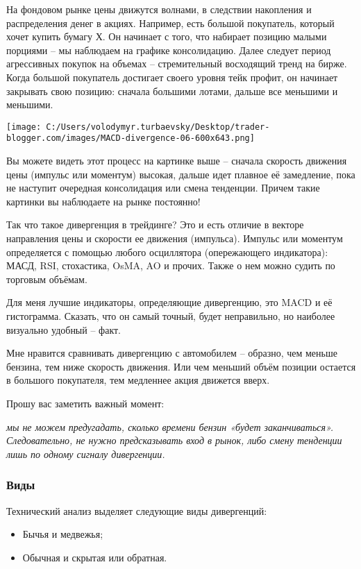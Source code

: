 \documentclass[a5paper]{article}
\begin{document}
На фондовом рынке цены движутся волнами, в следствии накопления и распределения денег в акциях. Например, есть большой покупатель, который хочет купить бумагу Х. Он начинает с того, что набирает позицию малыми порциями – мы наблюдаем на графике консолидацию. Далее следует период агрессивных покупок на объемах – стремительный восходящий тренд на бирже. Когда большой покупатель достигает своего уровня тейк профит, он начинает закрывать свою позицию: сначала большими лотами, дальше все меньшими и меньшими.

\texttt{[image: C:/Users/volodymyr.turbaevsky/Desktop/trader-blogger.com/images/MACD-divergence-06-600x643.png]}

Вы можете видеть этот процесс на картинке выше – сначала скорость движения цены (импульс или моментум) высокая, дальше идет плавное её замедление, пока не наступит очередная консолидация или смена тенденции. Причем такие картинки вы наблюдаете на рынке постоянно!

Так что такое дивергенция в трейдинге? Это и есть отличие в векторе направления цены и скорости ее движения (импульса). Импульс или моментум определяется с помощью любого осциллятора (опережающего индикатора): МАСД, RSI, стохастика, OsMA, AO и прочих. Также о нем можно судить по торговым объёмам.

Для меня лучшие индикаторы, определяющие дивергенцию, это MACD и её гистограмма. Сказать, что он самый точный, будет неправильно, но наиболее визуально удобный – факт.

Мне нравится сравнивать дивергенцию с автомобилем – образно, чем меньше бензина, тем ниже скорость движения. Или чем меньший объём позиции остается в большого покупателя, тем медленнее акция движется вверх.

Прошу вас заметить важный момент:

        \emph{мы не можем предугадать, сколько времени бензин «будет заканчиваться». Следовательно, не нужно предсказывать вход в рынок, либо смену тенденции лишь по одному сигналу дивергенции.}

\subsubsection{Виды}

Технический анализ выделяет следующие виды дивергенций:
\begin{itemize}
\item     Бычья и медвежья;
\item     Обычная и скрытая или обратная.
\end{itemize}
\end{document}
